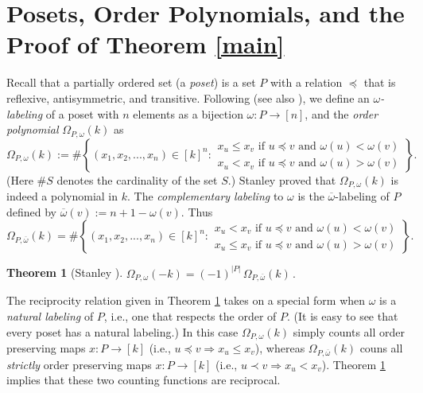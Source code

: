 \documentclass[11pt]{amsart}
\newtheorem{theorem}{Theorem}
\begin{document}

\section{Posets, Order Polynomials, and the Proof of Theorem \ref{main}}\label{pst}

Recall that a partially ordered set (a \emph{poset}) is a set $P$ with a relation $\preceq$ that is reflexive, antisymmetric, and
transitive.
Following \cite{stanleythesis} (see also \cite[Chapter 3]{Stanley}), we define an \emph{$\omega$-labeling} of a poset with $n$
elements as a bijection $\omega : P \rightarrow [n]$, and the \emph{order polynomial} $\Omega _{P,\omega}(k)$ as 
\[
  \Omega _{P,\omega} (k) := \# \left\{ (x_1, x_2, ... , x_n) \in [k]^n : 
  \begin{array}{l}
    x_u \leq x_v \text{ if } u \preceq v \text{ and } \omega (u) < \omega (v) \\
    x_u < x_v \text{ if } u \preceq v \text{ and } \omega (u) > \omega (v) 
  \end{array} \right\} .
\]
(Here $\# S$ denotes the cardinality of the set $S$.)
Stanley \cite{stanleythesis} proved that $\Omega _{P,\omega}(k)$ is indeed a polynomial in $k$. 
The \emph{complementary labeling} to $\omega$ %
is the $\overline{\omega}$-labeling of $P$ defined by $\overline{\omega}(v) := n+1-\omega(v)$.
Thus
\[
  \Omega _{P,\overline{\omega}} (k) = \# \left\{ (x_1, x_2, ... , x_n) \in [k]^n : 
  \begin{array}{l}
    x_u < x_v \text{ if } u \preceq v \text{ and } \omega (u) < \omega (v) \\
    x_u \le x_v \text{ if } u \preceq v \text{ and } \omega (u) > \omega (v) 
  \end{array} \right\} .
\]
  
\begin{theorem}[Stanley \cite{stanleythesis}]\label{stanley_op}
$
  \Omega _{P,\omega} (-k) = (-1)^{|P|} \, \Omega_{P,\overline{\omega}} (k) \, .
$
\end{theorem}

\noindent
The reciprocity relation given in Theorem \ref{stanley_op} takes on a special form when $\omega$ is a \emph{natural labeling} of $P$, i.e., one that respects the order of $P$.
(It is easy to see that every poset has a natural labeling.)
In this case $\Omega _{P,\omega} (k)$ simply counts all order preserving maps $x: P \to [k]$ (i.e., $u \preceq v \Longrightarrow x_u \le x_v$), whereas $\Omega_{P,\overline{\omega}} (k)$ couns all \emph{strictly} order preserving maps $x: P \to [k]$ (i.e., $u \prec v \Longrightarrow x_u < x_v$). 
Theorem \ref{stanley_op} implies that these two counting functions are reciprocal.
\end{document}
